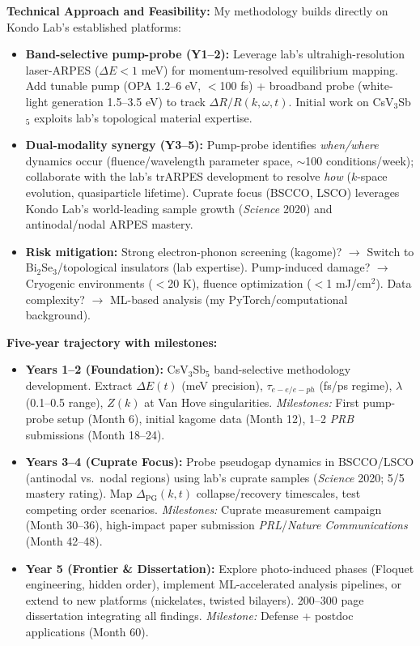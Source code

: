 \documentclass[11pt,a4paper]{article}
\begin{document}
\textbf{Technical Approach and Feasibility:}
My methodology builds directly on Kondo Lab's established platforms:
\begin{itemize}
    \item \textbf{Band-selective pump-probe (Y1--2):} Leverage lab's ultrahigh-resolution laser-ARPES ($\Delta E < 1$ meV) for momentum-resolved equilibrium mapping. Add tunable pump (OPA 1.2--6 eV, $<$100 fs) + broadband probe (white-light generation 1.5--3.5 eV) to track $\Delta R/R(k, \omega, t)$. Initial work on CsV$_3$Sb$_5$ exploits lab's topological material expertise.
    \item \textbf{Dual-modality synergy (Y3--5):} Pump-probe identifies \textit{when/where} dynamics occur (fluence/wavelength parameter space, $\sim$100 conditions/week); collaborate with the lab's trARPES development to resolve \textit{how} ($k$-space evolution, quasiparticle lifetime). Cuprate focus (BSCCO, LSCO) leverages Kondo Lab's world-leading sample growth (\textit{Science} 2020) and antinodal/nodal ARPES mastery.
    \item \textbf{Risk mitigation:} Strong electron-phonon screening (kagome)? $\to$ Switch to Bi$_2$Se$_3$/topological insulators (lab expertise). Pump-induced damage? $\to$ Cryogenic environments ($<$20 K), fluence optimization ($<$1 mJ/cm$^2$). Data complexity? $\to$ ML-based analysis (my PyTorch/computational background).
\end{itemize}

\textbf{Five-year trajectory with milestones:}
\begin{itemize}
    \item \textbf{Years 1--2 (Foundation):} CsV$_3$Sb$_5$ band-selective methodology development. Extract $\Delta E(t)$ (meV precision), $\tau_{e-e/e-ph}$ (fs/ps regime), $\lambda$ (0.1--0.5 range), $Z(k)$ at Van Hove singularities. \textit{Milestones:} First pump-probe setup (Month 6), initial kagome data (Month 12), 1--2 \textit{PRB} submissions (Month 18--24).
    \item \textbf{Years 3--4 (Cuprate Focus):} Probe pseudogap dynamics in BSCCO/LSCO (antinodal vs.~nodal regions) using lab's cuprate samples (\textit{Science} 2020; 5/5 mastery rating). Map $\Delta_\text{PG}(k, t)$ collapse/recovery timescales, test competing order scenarios. \textit{Milestones:} Cuprate measurement campaign (Month 30--36), high-impact paper submission \textit{PRL}/\textit{Nature Communications} (Month 42--48).
    \item \textbf{Year 5 (Frontier \& Dissertation):} Explore photo-induced phases (Floquet engineering, hidden order), implement ML-accelerated analysis pipelines, or extend to new platforms (nickelates, twisted bilayers). 200--300 page dissertation integrating all findings. \textit{Milestone:} Defense + postdoc applications (Month 60).
\end{itemize}
\end{document}
